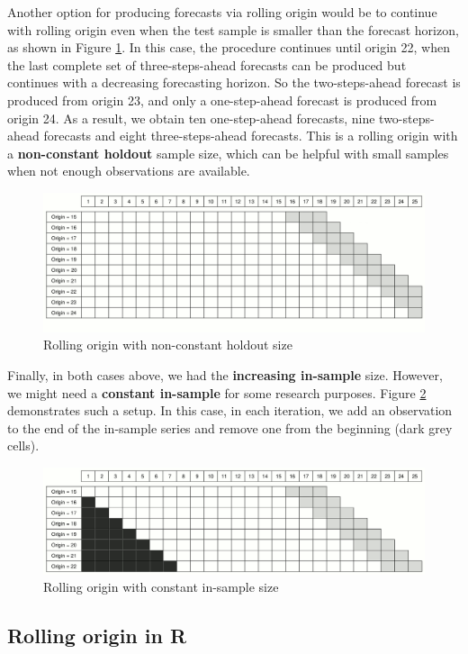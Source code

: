 \documentclass[]{book}
\theoremstyle{definition}
\theoremstyle{definition}
\theoremstyle{definition}
\theoremstyle{definition}
\theoremstyle{remark}
\begin{document}
Another option for producing forecasts via rolling origin would be to continue with rolling origin even when the test sample is smaller than the forecast horizon, as shown in Figure \ref{fig:ROProcessNoCO}. In this case, the procedure continues until origin 22, when the last complete set of three-steps-ahead forecasts can be produced but continues with a decreasing forecasting horizon. So the two-steps-ahead forecast is produced from origin 23, and only a one-step-ahead forecast is produced from origin 24. As a result, we obtain ten one-step-ahead forecasts, nine two-steps-ahead forecasts and eight three-steps-ahead forecasts. This is a rolling origin with a \textbf{non-constant holdout} sample size, which can be helpful with small samples when not enough observations are available.

\begin{figure}
\includegraphics[width=0.75\linewidth]{./images/03-ROProcessNoCO} \caption{Rolling origin with non-constant holdout size}\label{fig:ROProcessNoCO}
\end{figure}

Finally, in both cases above, we had the \textbf{increasing in-sample} size. However, we might need a \textbf{constant in-sample} for some research purposes. Figure \ref{fig:ROProcessCOCI} demonstrates such a setup. In this case, in each iteration, we add an observation to the end of the in-sample series and remove one from the beginning (dark grey cells).

\begin{figure}
\includegraphics[width=0.75\linewidth]{./images/03-ROProcessCOCI} \caption{Rolling origin with constant in-sample size}\label{fig:ROProcessCOCI}
\end{figure}

\hypertarget{rolling-origin-in-r}{%
\subsection{Rolling origin in R}\label{rolling-origin-in-r}}
\end{document}
